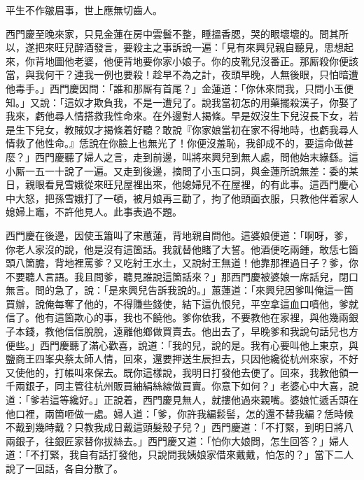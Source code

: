 \begin{myquote}
平生不作皺眉事，世上應無切齒人。
\end{myquote}

西門慶至晚來家，只見金蓮在房中雲鬟不整，睡搵香腮，哭的眼壞壞的。{}問其所以，遂把來旺兒醉酒發言，要殺主之事訴說一遍：「見有來興兒親自聽見，思想起來，你背地圖他老婆，他便背地要你家小娘子。你的皮靴兒沒番正。那厮殺你便該當，與我何干？連我一例也要殺！趁早不為之計，夜頭早晚，人無後眼，只怕暗遭他毒手。」西門慶因問：「誰和那厮有首尾？」金蓮道：「你休來問我，只問小玉便知。」又說：「這奴才欺負我，不是一遭兒了。說我當初怎的用藥擺殺漢子，你娶了我來，虧他尋人情搭救我性命來。在外邊對人揭條。早是奴沒生下兒沒長下女，若是生下兒女，教賊奴才揭條着好聽？{}敢說『你家娘當初在家不得地時，也虧我尋人情救了他性命。』恁說在你臉上也無光了！你便沒羞恥，我卻成不的，要這命做甚麼？」西門慶聽了婦人之言，走到前邊，叫將來興兒到無人處，問他始末緣繇。這小厮一五一十說了一遍。又走到後邊，摘問了小玉口詞，與金蓮所說無差：委的某日，親眼看見雪娥從來旺兒屋裡出來，他媳婦兒不在屋裡，的有此事。這西門慶心中大怒，把孫雪娥打了一頓，被月娘再三勸了，拘了他頭面衣服，只教他伴着家人媳婦上竈，不許他見人。此事表過不題。

西門慶在後邊，因使玉簫叫了宋蕙蓮，背地親自問他。{}這婆娘便道：「啊呀，爹，你老人家沒的說，他是沒有這箇話。我就替他賭了大誓。他酒便吃兩鍾，敢恁七箇頭八箇膽，背地裡罵爹？又吃紂王水土，又說紂王無道！他靠那裡過日子？爹，你不要聽人言語。我且問爹，聽見誰說這箇話來？」{}那西門慶被婆娘一席話兒，閉口無言。問的急了，說：「是來興兒告訴我說的。」蕙蓮道：「來興兒因爹叫俺這一箇買辦，說俺每奪了他的，不得賺些錢使，結下這仇恨兒，平空拿這血口噴他，爹就信了。他有這箇欺心的事，我也不饒他。爹你依我，不要教他在家裡，與他幾兩銀子本錢，教他信信脫脫，遠離他鄉做買賣去。{}他出去了，早晚爹和我說句話兒也方便些。」西門慶聽了滿心歡喜，說道：「我的兒，說的是。我有心要叫他上東京，與鹽商王四峯央蔡太師人情，回來，還要押送生辰担去，只因他纔從杭州來家，不好又使他的，打帳叫來保去。既你這樣說，我明日打發他去便了。回來，我教他領一千兩銀子，同主管往杭州販買紬絹絲線做買賣。你意下如何？」老婆心中大喜，說道：「爹若這等纔好。」正說着，西門慶見無人，就摟他過來親嘴。婆娘忙遞舌頭在他口裡，兩箇咂做一處。婦人道：「爹，你許我編鬏髻，怎的還不替我編？{}恁時候不戴到幾時戴？只教我成日戴這頭髮殼子兒？」西門慶道：「不打緊，到明日將八兩銀子，往銀匠家替你拔絲去。」西門慶又道：「怕你大娘問，怎生回答？」婦人道：「不打緊，我自有話打發他，只說問我姨娘家借來戴戴，怕怎的？」當下二人說了一回話，各自分散了。

